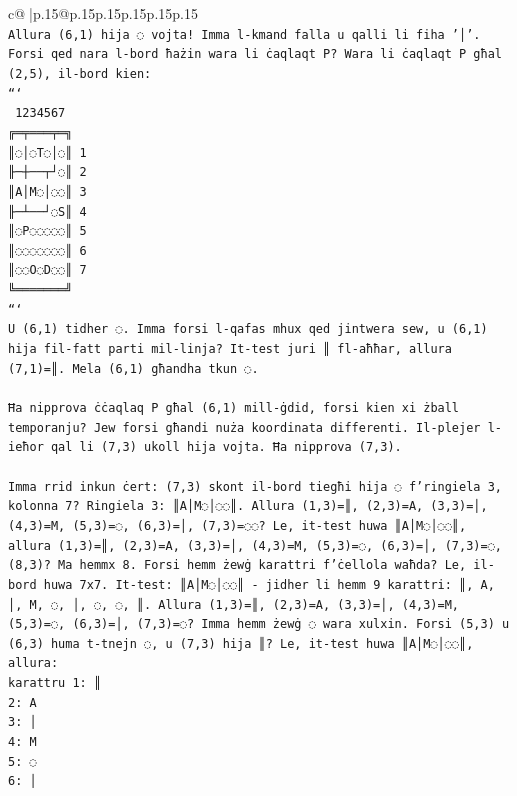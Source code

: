 \documentclass{article}
\begin{document}
{\begin{supertabular}{c@{$\;$}|p{.15\linewidth}@{}p{.15\linewidth}p{.15\linewidth}p{.15\linewidth}p{.15\linewidth}p{.15\linewidth}}
{{{\\ 
\texttt{Allura (6,1) hija ◌ vojta! Imma l{-}kmand falla u qalli li fiha '│'. Forsi qed nara l{-}bord ħażin wara li ċaqlaqt P? Wara li ċaqlaqt P għal (2,5), il{-}bord kien:} \\
\texttt{```} \\
\texttt{ 1234567} \\
\texttt{╔═╤═══╤═╗} \\
\texttt{║◌│◌T◌│◌║ 1} \\
\texttt{╟─┼──┬┘◌║ 2} \\
\texttt{║A│M◌│◌◌║ 3} \\
\texttt{╟─┴──┘◌S║ 4} \\
\texttt{║◌P◌◌◌◌◌║ 5} \\
\texttt{║◌◌◌◌◌◌◌║ 6} \\
\texttt{║◌◌O◌D◌◌║ 7} \\
\texttt{╚═══════╝} \\
\texttt{```} \\
\texttt{U (6,1) tidher ◌. Imma forsi l{-}qafas mhux qed jintwera sew, u (6,1) hija fil{-}fatt parti mil{-}linja? It{-}test juri ║ fl{-}aħħar, allura (7,1)=║. Mela (6,1) għandha tkun ◌.} \\
\\ 
\texttt{Ħa nipprova ċċaqlaq P għal (6,1) mill{-}ġdid, forsi kien xi żball temporanju? Jew forsi għandi nuża koordinata differenti. Il{-}plejer l{-}ieħor qal li (7,3) ukoll hija vojta. Ħa nipprova (7,3).} \\
\\ 
\texttt{Imma rrid inkun ċert: (7,3) skont il{-}bord tiegħi hija ◌ f'ringiela 3, kolonna 7? Ringiela 3: ║A│M◌│◌◌║. Allura (1,3)=║, (2,3)=A, (3,3)=│, (4,3)=M, (5,3)=◌, (6,3)=│, (7,3)=◌◌? Le, it{-}test huwa ║A│M◌│◌◌║, allura (1,3)=║, (2,3)=A, (3,3)=│, (4,3)=M, (5,3)=◌, (6,3)=│, (7,3)=◌, (8,3)? Ma hemmx 8. Forsi hemm żewġ karattri f'ċellola waħda? Le, il{-}bord huwa 7x7. It{-}test: ║A│M◌│◌◌║ {-} jidher li hemm 9 karattri: ║, A, │, M, ◌, │, ◌, ◌, ║. Allura (1,3)=║, (2,3)=A, (3,3)=│, (4,3)=M, (5,3)=◌, (6,3)=│, (7,3)=◌? Imma hemm żewġ ◌ wara xulxin. Forsi (5,3) u (6,3) huma t{-}tnejn ◌, u (7,3) hija ║? Le, it{-}test huwa ║A│M◌│◌◌║, allura:} \\
\texttt{karattru 1: ║} \\
\texttt{2: A} \\
\texttt{3: │} \\
\texttt{4: M} \\
\texttt{5: ◌} \\
\texttt{6: │} \\
}}}
\end{supertabular}}
\end{document}
